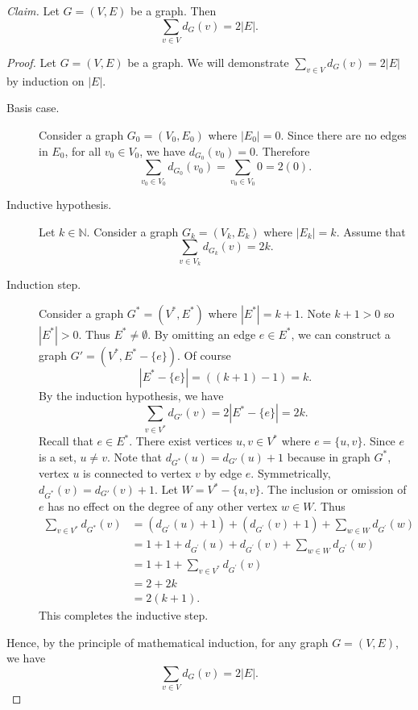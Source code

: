 \documentclass{article}
\newcommand{\N}{\mathbb{N}}
\theoremstyle{definition}
\begin{document}
\begin{solution}
\textit{Claim. }Let $G=(V,E)$ be a graph. Then \[\sum_{v\in V}{d_G(v)}=2|E|.\]
\begin{proof}
Let $G=(V,E)$ be a graph. We will demonstrate $\sum_{v\in V}{d_G(v)}=2|E|$ by induction on $|E|$.
\begin{description}
\item[Basis case.] Consider a graph $G_0=(V_0,E_0)$ where $|E_0|=0$. Since there are no edges in $E_0$, for all $v_0\in V_0$, we have $d_{G_0}(v_0)=0$. Therefore \[\sum_{v_0\in V_0}{d_{G_0}(v_0)}=\sum_{v_0\in V_0}{0}=2(0).\]
\item[Inductive hypothesis.] Let $k\in\N$. Consider a graph $G_k=(V_k,E_k)$ where $|E_k|=k$. Assume that \[\sum_{v\in V_k}{d_{G_k}(v)}=2k.\]
\item[Induction step.] Consider a graph $G^*=(V^*,E^*)$ where $|E^*|=k+1$. Note $k+1>0$ so $|E^*|>0$. Thus $E^*\neq\emptyset$. By omitting an edge $e\in E^*$, we can construct a graph $G'=(V^*,E^*-\{e\})$. Of course \[|E^*-\{e\}|=((k+1)-1)=k.\] By the induction hypothesis, we have \[\sum_{v\in V^*}{d_{G'}(v)=2|E^*-\{e\}|=2k}.\] Recall that $e\in E^*$. There exist vertices $u,v\in V^*$ where $e=\{u,v\}$. Since $e$ is a set, $u\neq v$. Note that $d_{G^*}(u)=d_{G'}(u)+1$ because in graph $G^*$, vertex $u$ is connected to vertex $v$ by edge $e$. Symmetrically, $d_{G^*}(v)=d_{G'}(v)+1$. Let $W=V^*-\{u,v\}$. The inclusion or omission of $e$ has no effect on the degree of any other vertex $w\in W$. Thus
\begin{align*}
\sum_{v\in V^*}{d_{G^*}(v)}
&=\left(d_{G^{'}}(u)+1\right)+\left(d_{G^{'}}(v)+1\right)+\sum_{w\in W}{d_{G^{'}}(w)}\\
&=1+1+d_{G^{'}}(u)+d_{G^{'}}(v)+\sum_{w\in W}{d_{G^{'}}(w)}\\
&=1+1+\sum_{v\in V^*}{d_{G^{'}}(v)}\\
&=2+2k\\
&=2(k+1).
\end{align*}
This completes the inductive step.
\end{description}
Hence, by the principle of mathematical induction, for any graph $G=(V,E)$, we have
\[\sum_{v\in V}d_G(v)=2|E|.\]
\end{proof}
\end{solution}
\end{document}

